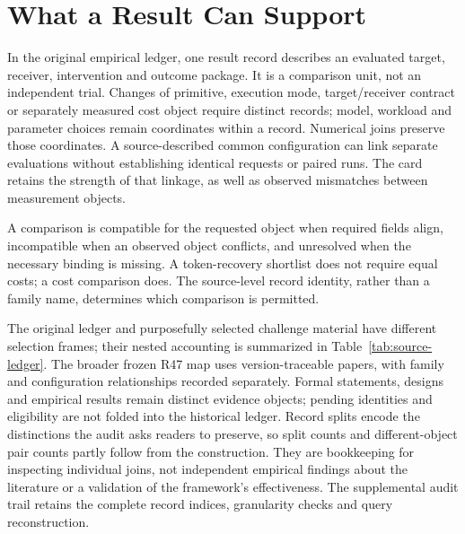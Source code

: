 \section{What a Result Can Support}\label{sec:scope}
In the original empirical ledger, one result record describes an evaluated target, receiver, intervention and outcome package. It is a comparison unit, not an independent trial. Changes of primitive, execution mode, target/receiver contract or separately measured cost object require distinct records; model, workload and parameter choices remain coordinates within a record. Numerical joins preserve those coordinates. A source-described common configuration can link separate evaluations without establishing identical requests or paired runs. The card retains the strength of that linkage, as well as observed mismatches between measurement objects.


A comparison is compatible for the requested object when required fields align, incompatible when an observed object conflicts, and unresolved when the necessary binding is missing. A token-recovery shortlist does not require equal costs; a cost comparison does. The source-level record identity, rather than a family name, determines which comparison is permitted.


The original ledger and purposefully selected challenge material have different selection frames; their nested accounting is summarized in Table~\ref{tab:source-ledger}. The broader frozen R47 map uses version-traceable papers, with family and configuration relationships recorded separately. Formal statements, designs and empirical results remain distinct evidence objects; pending identities and eligibility are not folded into the historical ledger. Record splits encode the distinctions the audit asks readers to preserve, so split counts and different-object pair counts partly follow from the construction. They are bookkeeping for inspecting individual joins, not independent empirical findings about the literature or a validation of the framework's effectiveness. The supplemental audit trail retains the complete record indices, granularity checks and query reconstruction.
